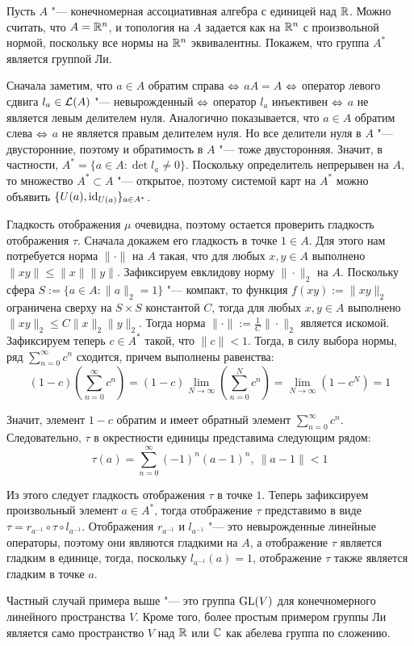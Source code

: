 \begin{example}
	Пусть $A$ "--- конечномерная ассоциативная алгебра с единицей над $\mathbb{R}$. Можно считать, что $A = \mathbb{R}^n$, и топология на $A$ задается как на $\mathbb{R}^n$ с произвольной нормой, поскольку все нормы на $\mathbb{R}^n$ эквивалентны. Покажем, что группа $A^*$ является группой Ли. 
	
	Сначала заметим, что $a \in A$ обратим справа $\Leftrightarrow$ $aA = A$ $\Leftrightarrow$ оператор левого сдвига $l_a \in \mathcal L(A)$ "--- невырожденный $\Leftrightarrow$ оператор $l_a$ инъективен $\Leftrightarrow$ $a$ не является левым делителем нуля. Аналогично показывается, что $a \in A$ обратим слева $\Leftrightarrow$ $a$ не является правым делителем нуля. Но все делители нуля в $A$ "--- двусторонние, поэтому и обратимость в $A$ "--- тоже двусторонняя. Значит, в частности, $A^* = \{a \in A: \det{l_a} \ne 0\}$. Поскольку определитель непрерывен на $A$, то множество $A^* \subset A$ "--- открытое, поэтому системой карт на $A^*$ можно объявить $\{U(a), \mathrm{id}_{U(a)}\}_{a \in A^*}$.
	
	Гладкость отображения $\mu$ очевидна, поэтому остается проверить гладкость отображения $\tau$. Сначала докажем его гладкость в точке $1 \in A$. Для этого нам потребуется норма $\| \cdot \|$ на $A$ такая, что для любых $x, y \in A$ выполнено $\|xy\| \le \|x\| \|y\|$. Зафиксируем евклидову норму $\| \cdot \|_2$ на $A$. Поскольку сфера $S := \{a \in A: \|a\|_2 = 1\}$ "--- компакт, то функция $f(xy) := \|xy\|_2$ ограничена сверху на $S \times S$ константой $C$, тогда для любых $x, y \in A$ выполнено $\|xy\|_2 \le C\|x\|_2\|y\|_2$. Тогда норма $\|\cdot\| := \frac{1}{C}\|\cdot\|_2$ является искомой. Зафиксируем теперь $c \in A^*$ такой, что $\|c\| < 1$. Тогда, в силу выбора нормы, ряд $\sum_{n=0}^\infty c^n$ сходится, причем выполнены равенства:
	\[(1-c)\left(\sum_{n=0}^\infty c^n\right) = (1-c)\lim_{N \to \infty}\left(\sum_{n=0}^Nc^n\right) = \lim_{N \to \infty}\left(1 - c^N\right) = 1\]
	
	Значит, элемент $1 - c$ обратим и имеет обратный элемент $\sum_{n=0}^\infty c^n$. Следовательно, $\tau$ в окрестности единицы представима следующим рядом:
	\[\tau(a) = \sum_{n=0}^\infty (-1)^n(a - 1)^n,~\|a - 1\| < 1\]
	
	Из этого следует гладкость отображения $\tau$ в точке $1$. Теперь зафиксируем произвольный элемент $a \in A^*$, тогда отображение $\tau$ представимо в виде $\tau = r_{a^{-1}} \circ \tau \circ l_{a^{-1}}$. Отображения $r_{a^{-1}}$ и $l_{a^{-1}}$ "--- это невырожденные линейные операторы, поэтому они являются гладкими на $A$, а отображение $\tau$ является гладким в единице, тогда, поскольку $l_{a^{-1}}(a) = 1$, отображение $\tau$ также является гладким в точке $a$.
\end{example}

\begin{note}
	Частный случай примера выше "--- это группа $\operatorname{GL}(V)$ для конечномерного линейного пространства $V$. Кроме того, более простым примером группы Ли является само пространство $V$ над $\mathbb{R}$ или $\mathbb{C}$ как абелева группа по сложению.
\end{note}